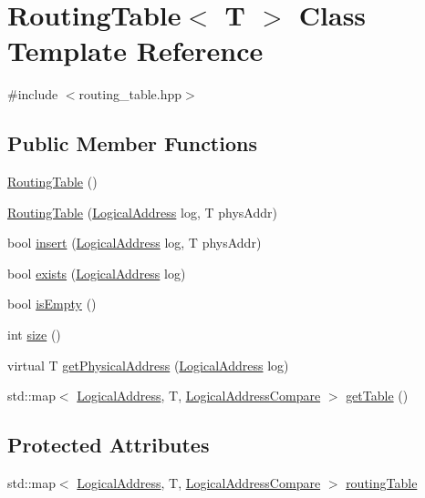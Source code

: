 \hypertarget{classRoutingTable}{}\section{Routing\+Table$<$ T $>$ Class Template Reference}
\label{classRoutingTable}


{\ttfamily \#include $<$routing\+\_\+table.\+hpp$>$}

\subsection*{Public Member Functions}
\begin{DoxyCompactItemize}
\item 
\hyperlink{classRoutingTable_a3a9220d6612a6731f4dcb2bf45265c2e}{Routing\+Table} ()
\item 
\hyperlink{classRoutingTable_ac7478945fabd9d107e8ecdafdb094602}{Routing\+Table} (\hyperlink{structLogicalAddress}{Logical\+Address} log, T phys\+Addr)
\item 
bool \hyperlink{classRoutingTable_a6732eb52fc45bc6ae93047b87f4726fe}{insert} (\hyperlink{structLogicalAddress}{Logical\+Address} log, T phys\+Addr)
\item 
bool \hyperlink{classRoutingTable_a82506122881b23b6c508ee3c5eceea2d}{exists} (\hyperlink{structLogicalAddress}{Logical\+Address} log)
\item 
bool \hyperlink{classRoutingTable_acdeee42f79a685483bc6e8ba5014de42}{is\+Empty} ()
\item 
int \hyperlink{classRoutingTable_a171f5d7e7f84b4415eae14f2161fc2e9}{size} ()
\item 
virtual T \hyperlink{classRoutingTable_ae55b8c9ac65251bdc462a81076f7a500}{get\+Physical\+Address} (\hyperlink{structLogicalAddress}{Logical\+Address} log)
\item 
std\+::map$<$ \hyperlink{structLogicalAddress}{Logical\+Address}, T, \hyperlink{structLogicalAddressCompare}{Logical\+Address\+Compare} $>$ \hyperlink{classRoutingTable_ad3786a2950ae5efb9cfe87449cc895e1}{get\+Table} ()
\end{DoxyCompactItemize}
\subsection*{Protected Attributes}
\begin{DoxyCompactItemize}
\item 
std\+::map$<$ \hyperlink{structLogicalAddress}{Logical\+Address}, T, \hyperlink{structLogicalAddressCompare}{Logical\+Address\+Compare} $>$ \hyperlink{classRoutingTable_ad348863258a92ca89d4150ca6f20aabb}{routing\+Table}
\end{DoxyCompactItemize}


